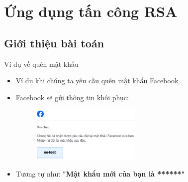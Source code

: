 \section{Ứng dụng tấn công RSA}

\subsection{Giới thiệu bài toán}

\begin{frame}{Ví dụ về quên mật khẩu}

\begin{itemize}
\item Ví dụ khi chúng ta yêu cầu quên mật khẩu Facebook
\item Facebook sẽ gửi thông tin khôi phục:

\begin{figure}[h]
\includegraphics[width=0.5\textwidth]{pictures/facebook.png}
\end{figure}

\item Tương tự như:
\textbf{"Mật khẩu mới của bạn là ******"}
\end{itemize}

\end{frame}




